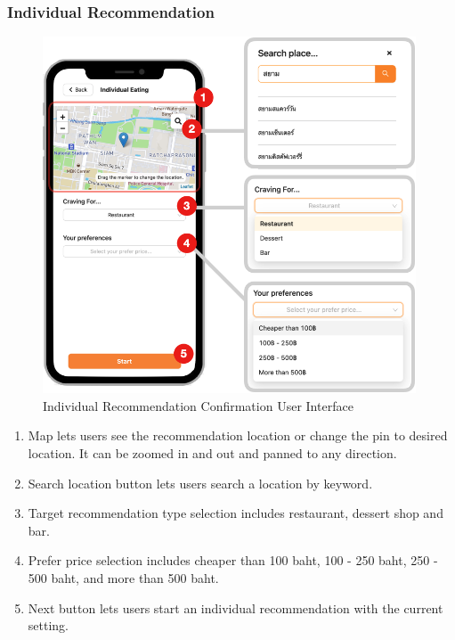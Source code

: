 \documentclass[12pt,oneside,openright,a4paper]{cpe-english-project}
\begin{document}
\subsubsection{Individual Recommendation}
\begin{figure}[H]\centering
\includegraphics[height=300pt]{./images/4ui_IndividualRecommendationConfirmationUserInterface.png}
\caption{Individual Recommendation Confirmation User Interface}\label{fig:4ui_IndividualRecommendationConfirmationUserInterface}
\end{figure}

\begin{enumerate}
\item Map lets users see the recommendation location or change the pin to desired location. It can be zoomed in and out and panned to any direction.
\item Search location button lets users search a location by keyword.
\item Target recommendation type selection includes restaurant, dessert shop and bar.
\item Prefer price selection includes cheaper than 100 baht, 100 - 250 baht, 250 - 500 baht, and more than 500 baht.
\item Next button lets users start an individual recommendation with the current setting.
\end{enumerate}
\end{document}
